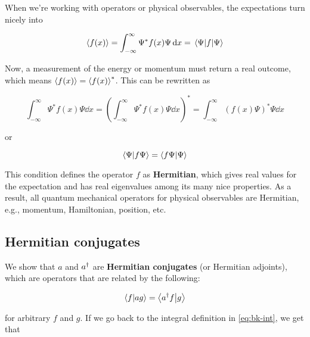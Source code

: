 When we're working with operators or physical observables, the expectations turn nicely into

\begin{equation}
	\expval{f(x)} = \int_{-\infty}^{\infty} \Psi^* f(x) \Psi \dd{x} = \mel{\Psi}{f}{\Psi} \label{eq:expval}
\end{equation}

Now, a measurement of the energy or momentum must return a real outcome, which means $\expval{f(x)}=\expval{f(x)}^*$. 
This can be rewritten as

\begin{equation*}
	\int_{-\infty}^{\infty} \Psi^* f(x) \Psi \dd{x} = \left( \int_{-\infty}^{\infty} \Psi^* f(x) \Psi \dd{x} \right)^* = \int_{-\infty}^{\infty} \left( f(x) \Psi\right)^* \Psi \dd{x}
\end{equation*}

\noindent or

\begin{equation}
	\braket{\Psi}{f\Psi} = \braket{f\Psi}{\Psi} \label{eq:hermitian}
\end{equation}

This condition defines the operator $f$ as \textbf{Hermitian}, which gives real values for the expectation and has real eigenvalues among its many nice properties. 
As a result, all quantum mechanical operators for physical observables are Hermitian, e.g., momentum, Hamiltonian, position, etc.


\subsection{Hermitian conjugates}

We show that $a$ and $a^{\dagger}$ are \textbf{Hermitian conjugates} (or Hermitian adjoints), which are operators that are related by the following:

\begin{tcolorbox}[title = Hermitian conjugates] \vspace{-2ex}
	\begin{equation}
		\braket{f}{ag} = \braket{a^{\dagger} f}{g} \label{eq:h-conj}
	\end{equation}
\end{tcolorbox}

\noindent for arbitrary $f$ and $g$. 
If we go back to the integral definition in \autoref{eq:bk-int}, we get that

